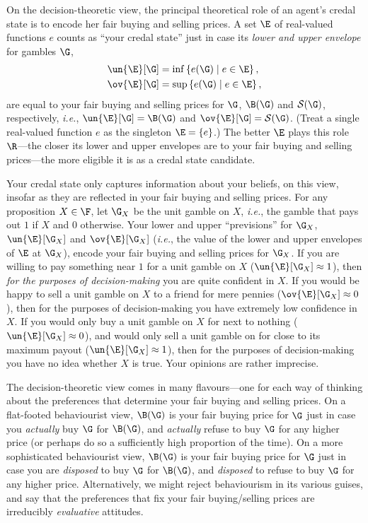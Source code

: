 On the decision-theoretic view, the principal theoretical role of an agent's credal state is to encode her fair buying and selling prices. A set $\E$ of real-valued functions $e$ counts as ``your credal state'' just in case its \textit{lower and upper envelope} for gambles $\G$,
$$
\begin{aligned}
\un{\E}[\G]&=\inf\left\{e(\G) \mathrel{|} e\in\E\right\},\\
\ov{\E}[\G]&=\sup\left\{e(\G) \mathrel{|} e\in\E\right\},
\end{aligned}
$$
are equal to your fair buying and selling prices for $\G$, $\B(\G)$ and $\mathcal{S}(\G)$, respectively, \textit{i.e.}, $\un{\E}[\G]=\B(\G)$ and $\ov{\E}[\G]=\mathcal{S}(\G)$. (Treat a single real-valued function $e$ as the singleton $\E=\left\{e\right\}$.) The better $\E$ plays this role $\R$---the closer its lower and upper envelopes are to your fair buying and selling prices---the more eligible it is as a credal state candidate.

Your credal state only captures information about your beliefs, on this view, insofar as they are reflected in your fair buying and selling prices. For any proposition $X\in\F$, let $\G_X$ be the unit gamble on $X$, \textit{i.e.}, the gamble that pays out \textsterling$1$ if $X$ and \textsterling$0$ otherwise. Your lower and upper ``previsions'' for $\G_X$, $\un{\E}[\G_X]$ and $\ov{\E}[\G_X]$ (\textit{i.e.}, the value of the lower and upper envelopes of $\E$ at $\G_X$), encode your fair buying and selling prices for $\G_X$. If you are willing to pay something near \textsterling$1$ for a unit gamble on $X$ ($\un{\E}[\G_X]\approx1$), then \textit{for the purposes of decision-making} you are quite confident in $X$. If you would be happy to sell a unit gamble on $X$ to a friend for mere pennies ($\ov{\E}[\G_X]\approx0$), then for the purposes of decision-making you have extremely low confidence in $X$. If you would only buy a unit gamble on $X$ for next to nothing ($\un{\E}[\G_X]\approx0$), and would only sell a unit gamble on for close to its maximum payout ($\un{\E}[\G_X]\approx1$), then for the purposes of decision-making you have no idea whether $X$ is true. Your opinions are rather imprecise.

The decision-theoretic view comes in many flavours---one for each way of thinking about the preferences that determine your fair buying and selling prices. On a flat-footed behaviourist view, $\B(\G)$ is your fair buying price for $\G$ just in case you \textit{actually} buy $\G$ for $\B(\G)$, and \textit{actually} refuse to buy $\G$ for any higher price (or perhaps do so a sufficiently high proportion of the time). On a more sophisticated behaviourist view, $\B(\G)$ is your fair buying price for $\G$ just in case you are \textit{disposed} to buy $\G$ for $\B(\G)$, and \textit{disposed} to refuse to buy $\G$ for any higher price. Alternatively, we might reject behaviourism in its various guises, and say that the preferences that fix your fair buying/selling prices are irreducibly \textit{evaluative} attitudes.

